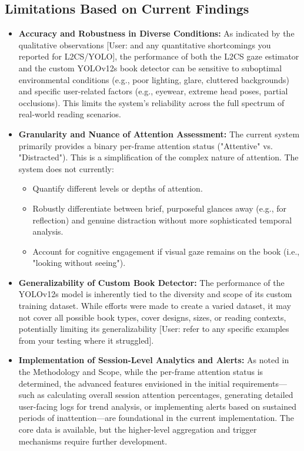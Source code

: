 \subsection{Limitations Based on Current Findings}
\begin{itemize}
    \item \textbf{Accuracy and Robustness in Diverse Conditions:} As indicated by the qualitative observations [User: and any quantitative shortcomings you reported for L2CS/YOLO], the performance of both the L2CS gaze estimator and the custom YOLOv12s book detector can be sensitive to suboptimal environmental conditions (e.g., poor lighting, glare, cluttered backgrounds) and specific user-related factors (e.g., eyewear, extreme head poses, partial occlusions). This limits the system's reliability across the full spectrum of real-world reading scenarios.
    
    \item \textbf{Granularity and Nuance of Attention Assessment:} The current system primarily provides a binary per-frame attention status ("Attentive" vs. "Distracted"). This is a simplification of the complex nature of attention. The system does not currently:
    \begin{itemize}
        \item Quantify different levels or depths of attention.
        \item Robustly differentiate between brief, purposeful glances away (e.g., for reflection) and genuine distraction without more sophisticated temporal analysis.
        \item Account for cognitive engagement if visual gaze remains on the book (i.e., "looking without seeing").
    \end{itemize}

    \item \textbf{Generalizability of Custom Book Detector:} The performance of the YOLOv12s model is inherently tied to the diversity and scope of its custom training dataset. While efforts were made to create a varied dataset, it may not cover all possible book types, cover designs, sizes, or reading contexts, potentially limiting its generalizability [User: refer to any specific examples from your testing where it struggled].
    
    \item \textbf{Implementation of Session-Level Analytics and Alerts:} As noted in the Methodology and Scope, while the per-frame attention status is determined, the advanced features envisioned in the initial requirements—such as calculating overall session attention percentages, generating detailed user-facing logs for trend analysis, or implementing alerts based on sustained periods of inattention—are foundational in the current implementation. The core data is available, but the higher-level aggregation and trigger mechanisms require further development.


\end{itemize}
